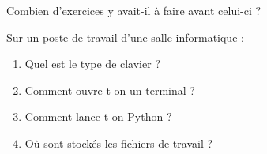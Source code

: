 	 \begin{td}\label{td:exercices}
	 Combien d'exercices y avait-il à faire avant celui-ci ?
	 \end{td}

	\begin{td}\label{td:labo}
	Sur un poste de travail d'une salle informatique :
	\begin{enumerate}
	\item Quel est le type de clavier ?
	\item Comment ouvre-t-on un terminal ?
	\item Comment lance-t-on {\sc Python} ?
	\item Où sont stockés les fichiers de travail ?
	\end{enumerate}
	\end{td}

